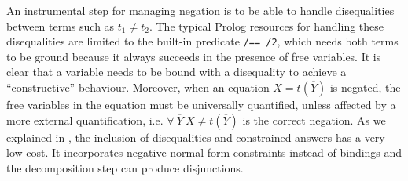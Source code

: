 \documentclass{llncs}
\begin{document}
An instrumental step for managing negation is to be able to handle
disequalities between terms such as $t_1 \neq t_2$.  The typical
Prolog resources for handling these disequalities are limited to the
built-in predicate {\tt /== /2}, which needs both terms to be ground
because it always succeeds in the presence of free variables.  It is
clear that a variable needs to be bound with a disequality to achieve
a ``constructive'' behaviour.  Moreover, when an equation $X =
t(\overline{Y})$ is negated, the free variables in the equation must
be universally quantified, unless affected by a more external
quantification, i.e. $\forall~ \overline{Y}~X \neq t(\overline{Y})$ is
the correct negation.  As we explained in \cite{SusanaPADL2000}, the
inclusion of disequalities and constrained answers has a very low
cost. It incorporates negative normal form constraints instead of
bindings and the decomposition step can produce disjunctions.






\end{document}
